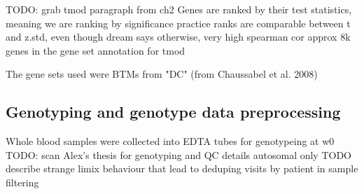 \begin{outline}
\1 TODO: grab tmod paragraph from ch2
    \2 Genes are ranked by their test statistics, meaning we are ranking by significance
        \3 practice ranks are comparable between t and z.std, even though dream says otherwise, very high spearman cor
    \2 approx 8k genes in the gene set annotation for tmod

The gene sets used were \glspl{BTM} from\autocite{li2013MolecularSignaturesAntibody}
"DC" (from Chaussabel et al. 2008)

\subsection{Genotyping and genotype data preprocessing}

%
%
%
%

\1 Whole blood samples were collected into EDTA tubes for genotypeing at w0
\1 TODO: scan Alex's thesis for genotyping and QC details
    \2 autosomal only
    \2 TODO describe strange limix behaviour that lead to deduping visits by patient in sample filtering



\end{outline}
